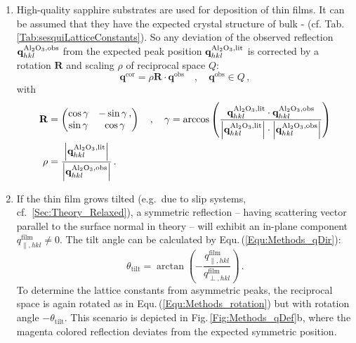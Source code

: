 \begin{enumerate}
    \item High-quality sapphire substrates are used for deposition of thin films.
    It can be assumed that they have the expected crystal structure of bulk \textalpha- (cf. Tab.\,\ref{Tab:sesquiLatticeConstants}).
    So any deviation of the observed reflection $\mathbf{q}_{hkl}^\mathrm{\ce{Al2O3},obs}$ from the expected peak position $\mathbf{q}_{hkl}^\mathrm{\ce{Al2O3},lit}$ is corrected by a rotation $\mathbf{R}$ and scaling $\rho$ of reciprocal space $Q$:
    \begin{equation}
        \mathbf{q}^\mathrm{cor}=\rho\mathbf{R}\cdot\mathbf{q}^\mathrm{obs}\quad,\quad\mathbf{q}^\mathrm{obs}\in Q\,,
    \end{equation}
    with
    \begin{align}
        \label{Equ:Methods_rotation}
        \mathbf{R}&=\begin{pmatrix}
            \cos\gamma&-\sin\gamma\,,\\
            \sin\gamma&\cos\gamma
        \end{pmatrix}\quad,\quad
        \gamma=\arccos\left(
            \frac
                {\mathbf{q}_{hkl}^\mathrm{\ce{Al2O3},lit}
                    \cdot\mathbf{q}_{hkl}^\mathrm{\ce{Al2O3},obs}}
                {\left|\mathbf{q}_{hkl}^\mathrm{\ce{Al2O3},lit}\right|
                    \cdot\left|\mathbf{q}_{hkl}^\mathrm{\ce{Al2O3},obs}\right|}
            \right)\\
        \rho&=\frac{\left|\mathbf{q}_{hkl}^\mathrm{\ce{Al2O3},lit}\right|}{\left|\mathbf{q}_{hkl}^\mathrm{\ce{Al2O3},obs}\right|}\,.
    \end{align}

    \item If the thin film grows tilted (e.g.\ due to slip systems, cf.~\ref{Sec:Theory_Relaxed}), a symmetric reflection -- having scattering vector parallel to the surface normal in theory -- will exhibit an in-plane component $q_{\parallel,hkl}^\mathrm{film}\neq0$.
    The tilt angle can be calculated by Equ.\,(\ref{Equ:Methods_qDir}): 
    \begin{equation}
        \theta_\mathrm{tilt}=\arctan\left(-\frac{q_{\parallel,hkl}^\mathrm{film}}{q_{\perp,hkl}^\mathrm{film}}\right)\,.
    \end{equation}
    To determine the lattice constants from asymmetric peaks, the reciprocal space is again rotated as in Equ.\,(\ref{Equ:Methods_rotation}) but with rotation angle $-\theta_\mathrm{tilt}$.
    This scenario is depicted in Fig.\,\ref{Fig:Methods_qDef}b, where the magenta colored reflection deviates from the expected symmetric position.


\end{enumerate}
